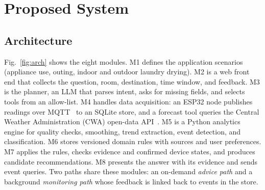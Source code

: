\documentclass[conference]{IEEEtran}
\newcommand{\M}[1]{M#1}
\begin{document}
\section{Proposed System}
\subsection{Architecture}
Fig.~\ref{fig:arch} shows the eight modules. \M{1} defines the application scenarios (appliance use, outing, indoor and outdoor laundry drying). \M{2} is a web front end that collects the question, room, destination, time window, and feedback. \M{3} is the planner, an LLM that parses intent, asks for missing fields, and selects tools from an allow-list. \M{4} handles data acquisition: an ESP32 node publishes readings over MQTT~\cite{mqtt5} to an SQLite store, and a forecast tool queries the Central Weather Administration (CWA) open-data API~\cite{cwa_api}. \M{5} is a Python analytics engine for quality checks, smoothing, trend extraction, event detection, and classification. \M{6} stores versioned domain rules with sources and user preferences. \M{7} applies the rules, checks evidence and confirmed device states, and produces candidate recommendations. \M{8} presents the answer with its evidence and sends event queries. Two paths share these modules: an on-demand \emph{advice path} and a background \emph{monitoring path} whose feedback is linked back to events in the store.
\end{document}
